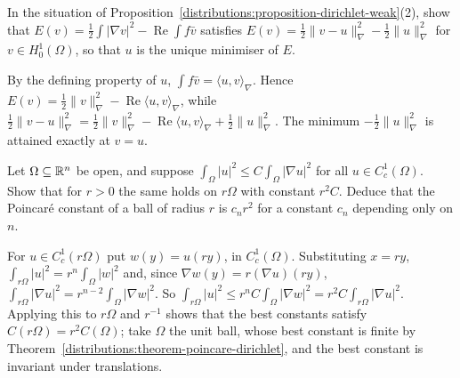 \begin{exercise}\label{distributions:exercise-dirichlet-energy}
In the situation of Proposition~\ref{distributions:proposition-dirichlet-weak}(2), show that $E(v) = \frac12\int|\nabla v|^2 - \operatorname{Re}\int f\bar v$ satisfies
$E(v) = \frac12\|v - u\|_\nabla^2 - \frac12\|u\|_\nabla^2$ for $v \in H^1_0(\Omega)$, so that $u$ is the unique minimiser of $E$.
\end{exercise}

\begin{solution}
By the defining property of $u$, $\int f\bar v = \langle u, v\rangle_\nabla$. Hence $E(v) = \frac12\|v\|_\nabla^2 - \operatorname{Re}\langle u, v\rangle_\nabla$, while
$\frac12\|v - u\|_\nabla^2 = \frac12\|v\|_\nabla^2 - \operatorname{Re}\langle u, v\rangle_\nabla + \frac12\|u\|_\nabla^2$. The minimum $-\frac12\|u\|_\nabla^2$ is attained exactly at $v = u$.
\end{solution}

\begin{exercise}\label{distributions:exercise-poincare-scaling}
Let $\Omega \subseteq \mathbb{R}^n$ be open, and suppose $\int_\Omega|u|^2 \leq C\int_\Omega|\nabla u|^2$ for all $u \in C^1_c(\Omega)$. Show that for $r > 0$ the same holds on $r\Omega$ with constant $r^2C$. Deduce
that the Poincar\'e constant of a ball of radius $r$ is $c_nr^2$ for a constant $c_n$ depending only on $n$.
\end{exercise}

\begin{solution}
For $u \in C^1_c(r\Omega)$ put $w(y) = u(ry)$, in $C^1_c(\Omega)$. Substituting $x = ry$, $\int_{r\Omega}|u|^2 = r^n\int_\Omega|w|^2$ and, since $\nabla w(y) = r(\nabla u)(ry)$,
$\int_{r\Omega}|\nabla u|^2 = r^{n-2}\int_\Omega|\nabla w|^2$. So $\int_{r\Omega}|u|^2 \leq r^nC\int_\Omega|\nabla w|^2 = r^2C\int_{r\Omega}|\nabla u|^2$. Applying this to $r\Omega$ and $r^{-1}$ shows that the best constants
satisfy $C(r\Omega) = r^2C(\Omega)$; take $\Omega$ the unit ball, whose best constant is finite by Theorem~\ref{distributions:theorem-poincare-dirichlet}, and the best constant is invariant under translations.
\end{solution}
